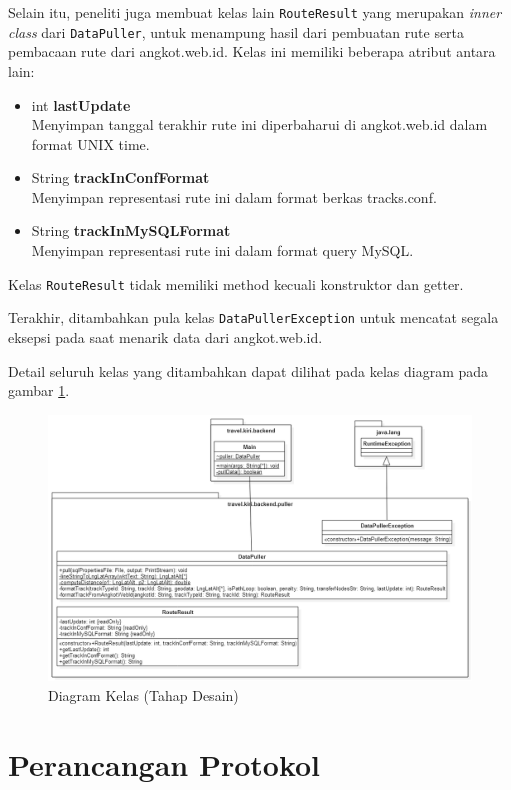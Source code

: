 Selain itu, peneliti juga membuat kelas lain \verb/RouteResult/ yang merupakan \textit{inner class} dari \verb/DataPuller/, untuk menampung hasil dari pembuatan rute serta pembacaan rute dari angkot.web.id. Kelas ini memiliki beberapa atribut antara lain:

\begin{itemize}
	\item int \textbf{lastUpdate} \\
		Menyimpan tanggal terakhir rute ini diperbaharui di angkot.web.id dalam format UNIX time.
	\item String \textbf{trackInConfFormat} \\
		Menyimpan representasi rute ini dalam format berkas tracks.conf.
	\item String \textbf{trackInMySQLFormat} \\
		Menyimpan representasi rute ini dalam format query MySQL.
\end{itemize}

Kelas \verb/RouteResult/ tidak memiliki method kecuali konstruktor dan getter.

Terakhir, ditambahkan pula kelas \verb/DataPullerException/ untuk mencatat segala eksepsi pada saat menarik data dari angkot.web.id.

Detail seluruh kelas yang ditambahkan dapat dilihat pada kelas diagram pada gambar \ref{fig:4_diagram_kelas}.

\begin{figure}
	\centering
	\includegraphics[scale=0.45]{Gambar/4_diagram_kelas}
	\caption{Diagram Kelas (Tahap Desain)} 
	\label{fig:4_diagram_kelas}
\end{figure}

\section{Perancangan Protokol}


